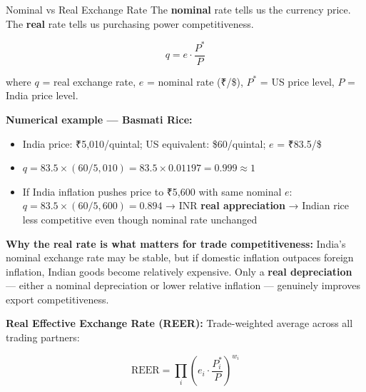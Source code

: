 \documentclass[
  ignorenonframetext,
  aspectratio=169,
]{beamer}
\makeatletter
\providecommand{\tightlist}{%
  \setlength{\itemsep}{0pt}\setlength{\parskip}{0pt}}
\let\quarto@originallabel\label
\DeclareRobustCommand*{\label}[1]{\quarto@originallabel{#1}}
\makeatother
\begin{document}
\begin{frame}{Nominal vs Real Exchange Rate}
\label{nominal-vs-real-exchange-rate}
The \textbf{nominal} rate tells us the currency price. The \textbf{real}
rate tells us purchasing power competitiveness.

\[q = e \cdot \frac{P^*}{P}\]

where \(q\) = real exchange rate, \(e\) = nominal rate (₹/\$), \(P^*\) =
US price level, \(P\) = India price level.

\textbf{Numerical example --- Basmati Rice:}

\begin{itemize}
\tightlist
\item
  India price: ₹5,010/quintal; US equivalent: \$60/quintal; \(e\) =
  ₹83.5/\$
\item
  \(q = 83.5 \times (60/5{,}010) = 83.5 \times 0.01197 = 0.999 \approx 1\)
\item
  If India inflation pushes price to ₹5,600 with same nominal \(e\):
  \(q = 83.5 \times (60/5{,}600) = 0.894\) → INR \textbf{real
  appreciation} → Indian rice less competitive even though nominal rate
  unchanged
\end{itemize}

\textbf{Why the real rate is what matters for trade competitiveness:}
India's nominal exchange rate may be stable, but if domestic inflation
outpaces foreign inflation, Indian goods become relatively expensive.
Only a \textbf{real depreciation} --- either a nominal depreciation or
lower relative inflation --- genuinely improves export competitiveness.

\textbf{Real Effective Exchange Rate (REER):} Trade-weighted average
across all trading partners:

\[\text{REER} = \prod_i \left(e_i \cdot \frac{P_i^*}{P}\right)^{w_i}\]
\end{frame}
\end{document}
